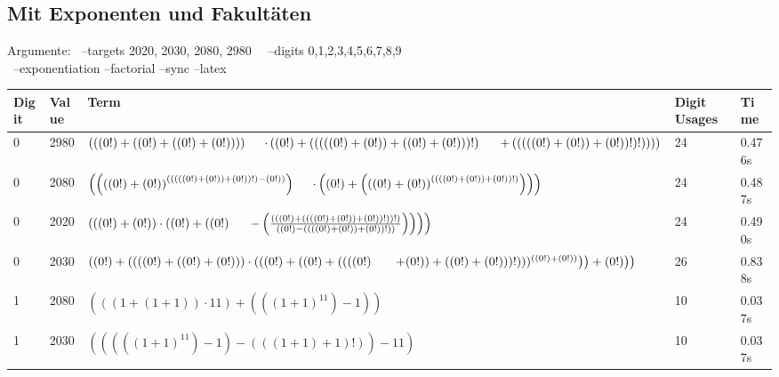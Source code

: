 \documentclass{article}
\theoremstyle{nonumberplain}
\newcommand{\nldelims}[1]{\right.#1\left.}
\newcommand{\mnl}{\nldelims{\newline}}
\begin{document}
\subsection{Mit Exponenten und Fakultäten}

Argumente:
~--targets 2020, 2030, 2080, 2980~
~--digits 0,1,2,3,4,5,6,7,8,9~\\
~--exponentiation --factorial --sync --latex~

\begin{center}
    \begin{longtable}{ | l | l | p{9.5cm} | l | l | }
    \hline \textbf{Digit} & \textbf{Value} & \textbf{Term} & \textbf{Digit Usages} & \textbf{Time} \\\hline
        0 & 2980 & \( \left(\left(\left(0!\right) + \left(\left(0!\right) + \left(\left(0!\right) + \left(0!\right)\right)\right)\right) \mnl\quad\cdot \left(\left(0!\right) + \left(\left((((0!) + (0!)) + ((0!) + (0!)))!\right) \nldelims{\nldelims{\mnl}}\ \ + \left(((((0!) + (0!)) + (0!))!)!\right)\right)\right)\right) \) & 24 & 0.476s \\\hline
        0 & 2080 & \( \left(\left({((0!) + (0!))}^{(((((0!) + (0!)) + (0!))!) - (0!))}\right) \mnl\quad\cdot \left(\left(0!\right) + \left({((0!) + (0!))}^{((((0!) + (0!)) + (0!))!)}\right)\right)\right) \) & 24 & 0.487s \\\hline
        0 & 2020 & \( \left(\left(\left(0!\right) + \left(0!\right)\right) \cdot \left(\left(0!\right) + \left(\left(0!\right) \nldelims{\nldelims{\mnl}}\ \ - \left(\frac{\left(((0!) + ((((0!) + (0!)) + (0!))!))!\right)}{\left(\left(0!\right) - \left((((0!) + (0!)) + (0!))!\right)\right)}\right)\right)\right)\right) \) & 24 & 0.490s \\\hline
        0 & 2030 & \( \left(\left(0!\right) + \left(\left(\left(\left(0!\right) + \left(\left(0!\right) + \left(0!\right)\right)\right) \cdot \left(((0!) + ((0!)+ ((((0!) \nldelims{\nldelims{\nldelims{\mnl}}}\ \ + (0!)) + ((0!) + (0!)))!)))^{((0!) + (0!))}\right)\right) + \left(0!\right)\right)\right) \) & 26 & 0.838s \\\hline
        1 & 2080 & \( \left(\left(\left(1 + \left(1 + 1\right)\right) \cdot 11\right) + \left(\left({(1 + 1)}^{11}\right) - 1\right)\right) \) & 10 & 0.037s \\\hline
        1 & 2030 & \( \left(\left(\left(\left({(1 + 1)}^{11}\right) - 1\right) - \left(((1 + 1) + 1)!\right)\right) - 11\right) \) & 10 & 0.037s \\\hline

\end{longtable}
\end{center}
\end{document}
